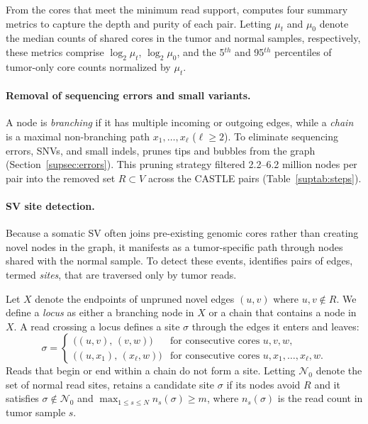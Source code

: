 From the cores that meet the minimum read support, \tool computes four summary metrics to capture the depth and purity of each pair.
Letting $\mu_t$ and $\mu_0$ denote the median counts of shared cores in the tumor and normal samples, respectively, these metrics comprise $\log_2\mu_t$, $\log_2\mu_0$, and the 5$^{th}$ and 95$^{th}$ percentiles of tumor-only core counts normalized by $\mu_t$.

\paragraph{Removal of sequencing errors and small variants.}
A node is \emph{branching} if it has multiple incoming or outgoing edges, while a \emph{chain} is a maximal non-branching path $x_1,\dots,x_\ell$ ($\ell \ge 2$). 
To eliminate sequencing errors, SNVs, and small indels, \tool prunes tips and bubbles from the graph  (Section~\ref{supsec:errors}).
This pruning strategy filtered 2.2--6.2 million nodes per pair into the removed set $R \subset V$ across the CASTLE pairs (Table~\ref{suptab:steps}).


\paragraph{SV site detection.}
Because a somatic SV often joins pre-existing genomic cores rather than creating novel nodes in the graph, it manifests as a tumor-specific path through nodes shared with the normal sample.
To detect these events, \tool identifies pairs of edges, termed \emph{sites}, that are traversed only by tumor reads.

Let $X$ denote the endpoints of unpruned novel edges $(u, v)$ where $u, v \notin R$.
We define a \emph{locus} as either a branching node in $X$ or a chain that contains a node in $X$.
A read crossing a locus defines a site $\sigma$ through the edges it enters and leaves:
\begin{equation}
\sigma =
\begin{cases}
\bigl((u,v),\,(v,w)\bigr) & \text{for consecutive cores } u, v, w,\\[2pt]
\bigl((u,x_1),\,(x_\ell,w)\bigr) & \text{for consecutive cores } u, x_1,\dots,x_\ell, w.
\end{cases}
\end{equation}
Reads that begin or end within a chain do not form a site.
Letting $\mathcal{N}_0$ denote the set of normal read sites, \tool retains a candidate site $\sigma$ if its nodes avoid $R$ and it satisfies $\sigma \notin \mathcal{N}_0$ and $\max_{1\le s\le N} n_s(\sigma) \ge m$, where $n_s(\sigma)$ is the read count in tumor sample $s$.

